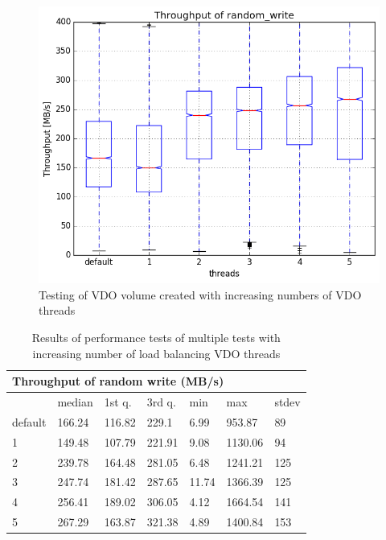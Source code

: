 \documentclass[
  color, %
  table, %
  lof,   %
  lot,   %
]{fithesis3}
\begin{document}
\begin{figure}[!htb]
        \centering
        \includegraphics[width=\textwidth]{../results/threads/direct/low_res/random_write1_compare_boxplots}
\caption[Tuning performance by increasing number of VDO threads]{Testing of VDO volume created with increasing numbers of VDO threads}
\label{fig:threads-all}
\end{figure}

\begin{table}
\begin{tabular}{|l|l|l|l|l|l|l|}
        \hline
        \multicolumn{7}{|l|}{Throughput of random write (MB/s)} \\ \hline
        & median & 1st q. & 3rd q. & min & max & stdev \\ \hline 
default & 166.24 & 116.82 & 229.1 & 6.99 & 953.87 & 89 \\ \hline
1 & 149.48 & 107.79 & 221.91 & 9.08 & 1130.06 & 94 \\ \hline
2 & 239.78 & 164.48 & 281.05 & 6.48 & 1241.21 & 125 \\ \hline
3 & 247.74 & 181.42 & 287.65 & 11.74 & 1366.39 & 125 \\ \hline
4 & 256.41 & 189.02 & 306.05 & 4.12 & 1664.54 & 141 \\ \hline
5 & 267.29 & 163.87 & 321.38 & 4.89 & 1400.84 & 153 \\ \hline
\end{tabular}
\caption[Tuning performance by increasing number of VDO threads]{Results of performance tests of multiple tests with increasing number of load balancing VDO threads}
\label{tab:tuning}
\end{table}
\end{document}
